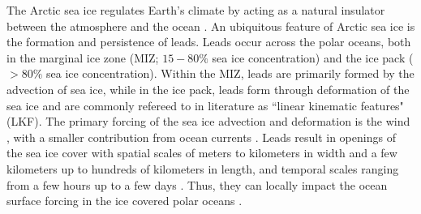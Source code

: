 \documentclass[lineno,sn-basic]{sn-jnl}%
\begin{document}


\maketitle


The Arctic sea ice regulates Earth's climate by acting as a natural insulator between the atmosphere and the ocean \citep{Wettlaufer_insulator_1997, Untersteiner_ice_insulator_1961}. An ubiquitous feature of Arctic sea ice is the formation and persistence of leads. Leads occur across the polar oceans, both in the marginal ice zone (MIZ; $15-80\%$ sea ice concentration) and the ice pack ($>80\%$ sea ice concentration). Within the MIZ, leads are primarily formed by the advection of sea ice, while in the ice pack, leads form through deformation of the sea ice and are commonly refereed to in literature as ``linear kinematic features" (LKF). 
The primary forcing of the sea ice advection and deformation is the wind \citep{Linow_lkf_2017, Hutter_scaling_lkf_2018}, with a smaller contribution from ocean currents \citep{Willmes_leads_currents_2023}.
Leads result in openings of the sea ice cover \citep{Rampal_nextsim_2016, Hutchings_model_lkf_2005, Richter_pack_stress_2002} with spatial scales of meters to kilometers in width and a few kilometers up to hundreds of kilometers in length, and temporal scales ranging from a few hours up to a few days \citep{Linow_lkf_2017, Wernecke_Lead_2015, Tschudi_obs_leads_1998}. Thus, they can locally impact the ocean surface forcing in the ice covered polar oceans \citep{Lupkes_leads_2008}.
\end{document}
